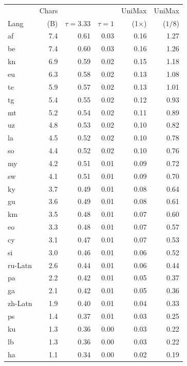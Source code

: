 \documentclass{article} %
\begin{document}
\begin{table}[t]
\begin{center}
{\quad
\begin{tabular}{lrrrrr}
\toprule
& \multicolumn{1}{r}{Chars} & & &
  \multicolumn{1}{r}{UniMax} &
  \multicolumn{1}{r}{UniMax} \\
Lang &
  \multicolumn{1}{r}{(B)} &
  \multicolumn{1}{r}{$\tau = 3.33$} &
  \multicolumn{1}{r}{$\tau = 1$} &
  \multicolumn{1}{r}{(1$\times$)} &
  \multicolumn{1}{r}{($1/8$)} \\
  \midrule
af      & 7.4 & 0.61 & 0.03 & 0.16 & 1.27 \\
be      & 7.4 & 0.60 & 0.03 & 0.16 & 1.26 \\
kn      & 6.9 & 0.59 & 0.02 & 0.15 & 1.18 \\
eu      & 6.3 & 0.58 & 0.02 & 0.13 & 1.08 \\
te      & 5.9 & 0.57 & 0.02 & 0.13 & 1.01 \\
tg      & 5.4 & 0.55 & 0.02 & 0.12 & 0.93 \\
mt      & 5.2 & 0.54 & 0.02 & 0.11 & 0.89 \\
uz      & 4.8 & 0.53 & 0.02 & 0.10 & 0.82 \\
la      & 4.5 & 0.52 & 0.02 & 0.10 & 0.78 \\
so      & 4.4 & 0.52 & 0.02 & 0.10 & 0.76 \\
my      & 4.2 & 0.51 & 0.01 & 0.09 & 0.72 \\
sw      & 4.1 & 0.51 & 0.01 & 0.09 & 0.70 \\
ky      & 3.7 & 0.49 & 0.01 & 0.08 & 0.64 \\
gu      & 3.6 & 0.49 & 0.01 & 0.08 & 0.61 \\
km      & 3.5 & 0.48 & 0.01 & 0.07 & 0.60 \\
eo      & 3.3 & 0.48 & 0.01 & 0.07 & 0.57 \\
cy      & 3.1 & 0.47 & 0.01 & 0.07 & 0.53 \\
si      & 3.0 & 0.46 & 0.01 & 0.06 & 0.52 \\
ru-Latn & 2.6 & 0.44 & 0.01 & 0.06 & 0.44 \\
pa      & 2.2 & 0.42 & 0.01 & 0.05 & 0.37 \\
ga      & 2.1 & 0.42 & 0.01 & 0.05 & 0.36 \\
zh-Latn & 1.9 & 0.40 & 0.01 & 0.04 & 0.33 \\
ps      & 1.4 & 0.37 & 0.01 & 0.03 & 0.25 \\
ku      & 1.3 & 0.36 & 0.00 & 0.03 & 0.22 \\
lb      & 1.3 & 0.36 & 0.00 & 0.03 & 0.22 \\
ha      & 1.1 & 0.34 & 0.00 & 0.02 & 0.19 \\

\end{tabular}}
\end{center}
\end{table}
\end{document}
